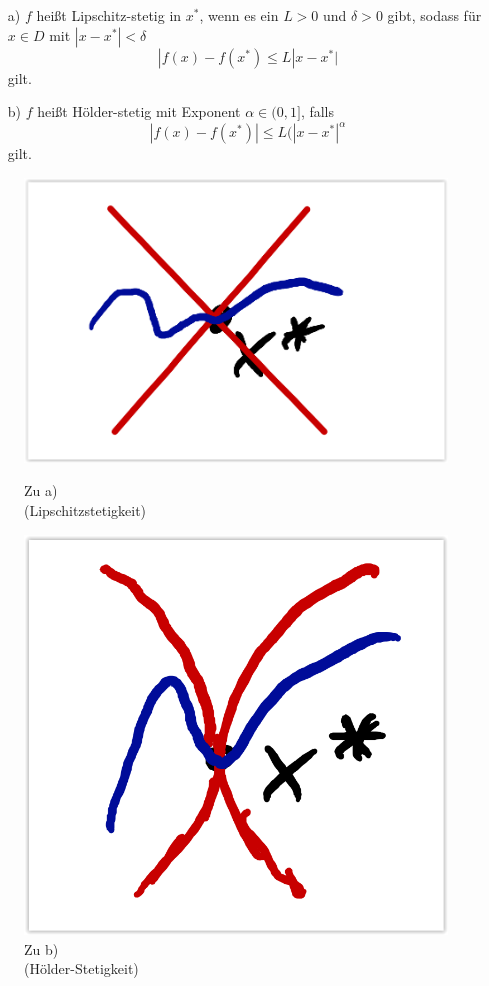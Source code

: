   \begin{definition}
    \begin{itemize}
      \item[a) ] $f$ heißt Lipschitz-stetig in $x^*$, wenn es ein $L > 0$ und $\delta > 0$ gibt, sodass für $x \in D$ mit $|x-x^*| < \delta$
	      \begin{equation}
	        |f(x) - f(x^*) \leq L|x-x^*|
	      \end{equation}
	      gilt.
      \item[b) ] $f$ heißt Hölder-stetig mit Exponent $\alpha \in (0,1]$, falls
	      \begin{equation}
	        |f(x) - f(x^*)| \leq L(|x-x^*|^\alpha
	      \end{equation}
	      gilt.
    \end{itemize}
    \begin{figure}[H] 
			\centering
			\begin{minipage}{.5\textwidth}
			  \centering
			  \captionsetup{justification=centering}
			  \includegraphics[width=0.9\linewidth]{./img/stetigkeit_lipschitz.png}
			  \caption{Zu a) \\ (Lipschitzstetigkeit) \protect\cite{HM12}}
			  \label{fig:stetigkeit_lipschitz}
			\end{minipage}%
			\begin{minipage}{.5\textwidth}
			  \centering
			  \captionsetup{justification=centering}
			  \includegraphics[width=0.65\linewidth]{./img/stetigkeit_hoelder.png}
			  \caption{Zu b) \\ (Hölder-Stetigkeit) \protect\cite{HM12}}
			  \label{fig:stetigkeit_hoelder}
			\end{minipage}
    \end{figure}
  \end{definition}
